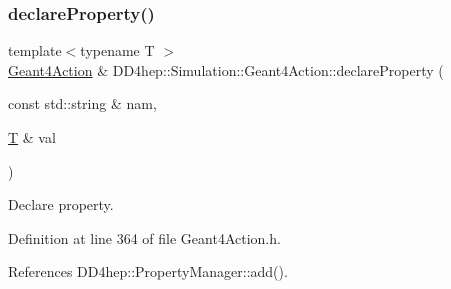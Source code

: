 \subsubsection{\texorpdfstring{declare\+Property()}{declareProperty()}\hspace{0.1cm}{\footnotesize\ttfamily [1/2]}}
{\footnotesize\ttfamily template$<$typename T $>$ \\
\hyperlink{class_d_d4hep_1_1_simulation_1_1_geant4_action}{Geant4\+Action} \& D\+D4hep\+::\+Simulation\+::\+Geant4\+Action\+::declare\+Property (\begin{DoxyParamCaption}\item[{const std\+::string \&}]{nam,  }\item[{\hyperlink{class_t}{T} \&}]{val }\end{DoxyParamCaption})}



Declare property. 



Definition at line 364 of file Geant4\+Action.\+h.



References D\+D4hep\+::\+Property\+Manager\+::add().



